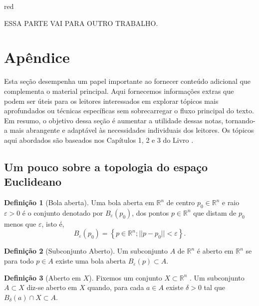 \documentclass[12pt,leqno,twoside]{amsart}
\theoremstyle{definition}
\newtheorem{definicao}{Definição}[section]
\begin{document}
\begin{color}{red}

ESSA PARTE VAI PARA OUTRO TRABALHO.
\section{Apêndice}

Esta seção desempenha um papel importante ao fornecer conteúdo adicional que complementa o material principal. Aqui fornecemos  informações extras que podem ser úteis para os leitores interessados em explorar tópicos mais aprofundados ou técnicas específicas  sem sobrecarregar o fluxo principal do texto. Em resumo, o objetivo dessa seção é aumentar  a utilidade dessas notas, tornando-a mais abrangente e adaptável às necessidades individuais dos leitores. Os tópicos aqui abordados são baseados nos Capítulos 1, 2 e 3 do Livro \cite{E2}.

\vspace{0.3cm}

\subsection{Um pouco sobre a topologia do espaço Euclideano}

\vspace{0.3cm}

\begin{definicao}[Bola aberta]
	Uma bola aberta em $\mathbb{R}^n$ de centro $p_0 \in \mathbb{R}^n$ e raio $\varepsilon > 0$ é o conjunto denotado por $B_{\varepsilon}(p_0)$, dos pontos $p \in \mathbb{R}^n$ que distam de $p_0$ menos que $\varepsilon$, isto é, $$B_{\varepsilon}(p_0) = \left\{p\in \mathbb{R}^n ; || p - p_0|| < \varepsilon\right\}.$$
\end{definicao}

\vspace{0.3cm}

\begin{definicao}[Subconjunto Aberto]
	Um subconjunto $A$ de  $\mathbb{R}^n$  é aberto em $\mathbb{R}^n$ se para todo $p \in A$ existe uma bola aberta $B_{\varepsilon}(p) \subset A$.
\end{definicao}

\vspace{0.3cm}

\begin{definicao}[Aberto em $X$]
	Fixemos um conjunto $X \subset \mathbb{R}^n$ . Um subconjunto $A \subset X$ diz-se aberto em $X$ quando, para cada $a\in A$ existe $\delta >0$ tal que $B_{\delta}(a) \cap X \subset A$.
\end{definicao}


\end{color}
\end{document}
